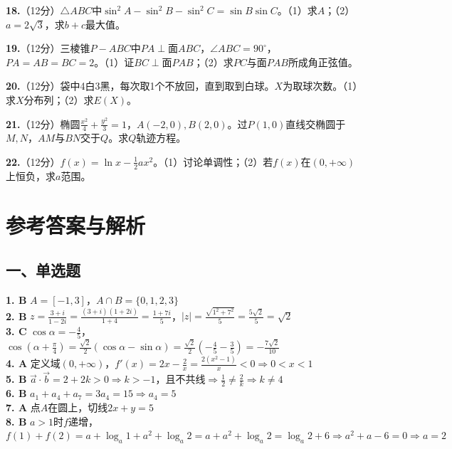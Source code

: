 \documentclass[12pt,a4paper]{ctexart}
\begin{document}
\vspace{6cm}

\textbf{18.}（12分）$\triangle ABC$中$\sin^2A-\sin^2B-\sin^2C=\sin B\sin C$。（1）求$A$；（2）$a=2\sqrt3$，求$b+c$最大值。

\vspace{7cm}

\textbf{19.}（12分）三棱锥$P-ABC$中$PA\perp$面$ABC$，$\angle ABC=90^\circ$，$PA=AB=BC=2$。（1）证$BC\perp$面$PAB$；（2）求$PC$与面$PAB$所成角正弦值。

\vspace{7cm}

\textbf{20.}（12分）袋中4白3黑，每次取1个不放回，直到取到白球。$X$为取球次数。（1）求$X$分布列；（2）求$E(X)$。

\vspace{6cm}

\textbf{21.}（12分）椭圆$\frac{x^2}{4}+\frac{y^2}{3}=1$，$A(-2,0),B(2,0)$。过$P(1,0)$直线交椭圆于$M,N$，$AM$与$BN$交于$Q$。求$Q$轨迹方程。

\vspace{7cm}

\textbf{22.}（12分）$f(x)=\ln x-\frac12ax^2$。（1）讨论单调性；（2）若$f(x)$在$(0,+\infty)$上恒负，求$a$范围。

\newpage
\section*{参考答案与解析}

\subsection*{一、单选题}
\textbf{1. B} $A=[-1,3]$，$A\cap B=\{0,1,2,3\}$\\
\textbf{2. B} $z=\frac{3+i}{1-2i}=\frac{(3+i)(1+2i)}{1+4}=\frac{1+7i}{5}$，$|z|=\frac{\sqrt{1^2+7^2}}{5}=\frac{5\sqrt2}{5}=\sqrt2$\\
\textbf{3. C} $\cos\alpha=-\frac45$，$\cos(\alpha+\frac{\pi}{4})=\frac{\sqrt2}{2}(\cos\alpha-\sin\alpha)=\frac{\sqrt2}{2}(-\frac45-\frac35)=-\frac{7\sqrt2}{10}$\\
\textbf{4. A} 定义域$(0,+\infty)$，$f'(x)=2x-\frac2x=\frac{2(x^2-1)}{x}<0\Rightarrow0<x<1$\\
\textbf{5. B} $\vec{a}\cdot\vec{b}=2+2k>0\Rightarrow k>-1$，且不共线$\Rightarrow\frac12\neq\frac2k\Rightarrow k\neq4$\\
\textbf{6. B} $a_1+a_4+a_7=3a_4=15\Rightarrow a_4=5$\\
\textbf{7. A} 点$A$在圆上，切线$2x+y=5$\\
\textbf{8. B} $a>1$时$f$递增，$f(1)+f(2)=a+\log_a1+a^2+\log_a2=a+a^2+\log_a2=\log_a2+6\Rightarrow a^2+a-6=0\Rightarrow a=2$
\end{document}
